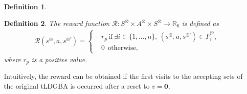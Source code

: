 \documentclass[letterpaper, 10 pt, conference]{ieeeconf}  %
\newtheorem{definition}{Definition}
\begin{document}
\begin{definition}

\label{def9}
\end{definition}

\begin{definition}
  The reward function $\mathcal{R} :S^{\otimes} \times A^{\otimes} \times S^{\otimes} \rightarrow {\mathbb R}_{0}$ is defined as
  \begin{align}
    \mathcal{R}(s^{\otimes}, a, s^{\otimes \prime}) =
    \left\{
    \begin{aligned}
      &r_p \  \text{if}\ \exists i \in \! \{ 1, \ldots ,n \},\ (s^{\otimes}, a, s^{\otimes \prime}) \in \bar{F}^{\otimes}_i \!,\\
      &0   \ \ \text{otherwise},
    \end{aligned}
    \right. \nonumber
  \end{align}
  where $r_p$ is a positive value.
  \label{def10}
\end{definition}

Intuitively, the reward can be obtained if the first visits to the accepting sets of the original tLDGBA is occurred after a reset to $v=\bm{0}$.
\end{document}
